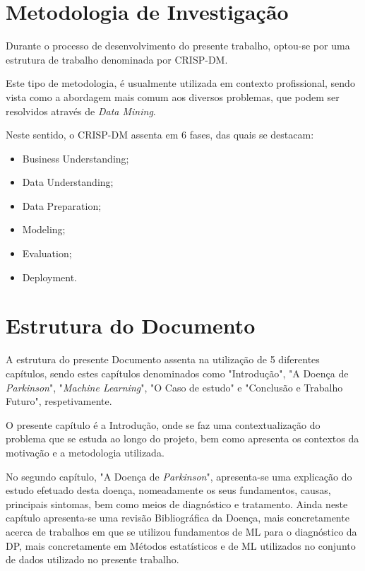 \documentclass[12pt,a4paper,twoside]{report}
\begin{document}
{\section{Metodologia de Investigação}

Durante o processo de desenvolvimento do presente trabalho, optou-se por uma estrutura de trabalho denominada por \gls{CRISP-DM}.

Este tipo de metodologia, é usualmente utilizada em contexto profissional, sendo vista como a abordagem mais comum aos diversos problemas, que podem ser resolvidos através de \emph{Data Mining}.

Neste sentido, o \gls{CRISP-DM} assenta em 6 fases, das quais se destacam:

\begin{itemize} 
\itemsep-0.5em 
    \item Business Understanding; 
    \item Data Understanding;
    \item Data Preparation;
    \item Modeling; 
    \item Evaluation;
    \item Deployment.
\end{itemize}

\section{Estrutura do Documento}

A estrutura do presente Documento assenta na utilização de 5 diferentes capítulos, sendo estes capítulos denominados como "Introdução", "A Doença de \textit{Parkinson}", "\textit{Machine Learning}", "O Caso de estudo" e "Conclusão e Trabalho Futuro", respetivamente.

O presente capítulo é a Introdução, onde se faz uma contextualização do problema que se estuda ao longo do projeto, bem como apresenta os contextos da motivação e a metodologia utilizada.

No segundo capítulo, "A Doença de \textit{Parkinson}", apresenta-se uma explicação do estudo efetuado desta doença, nomeadamente os seus fundamentos, causas, principais sintomas, bem como meios de diagnóstico e tratamento. Ainda neste capítulo apresenta-se uma revisão Bibliográfica da Doença, mais concretamente acerca de trabalhos em que se utilizou fundamentos de \gls{ML} para o diagnóstico da \gls{DP}, mais concretamente em Métodos estatísticos e de \gls{ML} utilizados no conjunto de dados utilizado no presente trabalho.

}
\end{document}
